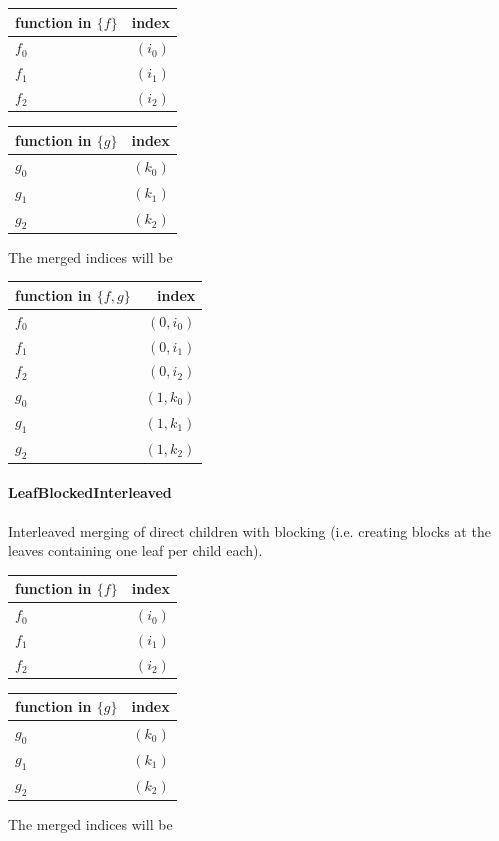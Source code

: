 \documentclass[a4paper,10pt,headings=normal,bibliography=totoc]{scrartcl}
\begin{document}
\begin{tabular}{l|r}
   function in $\{f\}$ & index \\
   \hline
   $f_0$  & $(i_0)$ \\
   $f_1$  & $(i_1)$ \\
   $f_2$  & $(i_2)$
\end{tabular}

\begin{tabular}{l|r}
   function in $\{g\}$ & index \\
   \hline
   $g_0$  & $(k_0)$ \\
   $g_1$  & $(k_1)$ \\
   $g_2$  & $(k_2)$
\end{tabular}

The merged indices will be

\begin{tabular}{l|r}
   function in $\{f,g\}$ & index \\
   \hline
   $f_0$  & $(0,i_0)$ \\
   $f_1$  & $(0,i_1)$ \\
   $f_2$  & $(0,i_2)$ \\
   $g_0$  & $(1,k_0)$ \\
   $g_1$  & $(1,k_1)$ \\
   $g_2$  & $(1,k_2)$
\end{tabular}

\paragraph{LeafBlockedInterleaved}
Interleaved merging of direct children with blocking (i.e. creating blocks at the leaves containing one leaf per child each).

\begin{tabular}{l|r}
   function in $\{f\}$ & index \\
   \hline
   $f_0$  & $(i_0)$ \\
   $f_1$  & $(i_1)$ \\
   $f_2$  & $(i_2)$
\end{tabular}

\begin{tabular}{l|r}
   function in $\{g\}$ & index \\
   \hline
   $g_0$  & $(k_0)$ \\
   $g_1$  & $(k_1)$ \\
   $g_2$  & $(k_2)$
\end{tabular}

The merged indices will be
\end{document}
